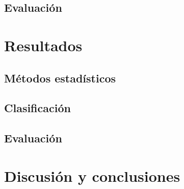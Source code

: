 \documentclass[colorinlistoftodos]{article}
\begin{document}
\subsection{Evaluación}

\section{Resultados}
\subsection{Métodos estadísticos}

\subsection{Clasificación}
\subsection{Evaluación}

\section{Discusión y conclusiones}




\listoftodos%
\end{document}
